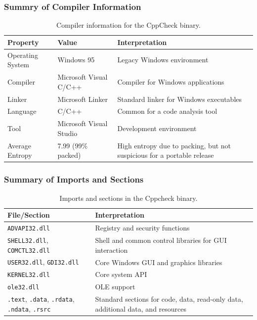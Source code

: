 \documentclass{article}
\begin{document}
\subsubsection{Summry of Compiler Information}
\begin{table}[H]
  \centering
  \begin{tabular}{|p{3cm}|p{3cm}|p{6cm}|}
    \hline
    \textbf{Property} & \textbf{Value} & \textbf{Interpretation} \\
    \hline
    Operating System & Windows 95 & Legacy Windows environment \\
    \hline
    Compiler & Microsoft Visual C/C++ & Compiler for Windows applications \\
    \hline
    Linker & Microsoft Linker & Standard linker for Windows executables \\
    \hline
    Language & C/C++ &  Common for a code analysis tool \\
    \hline
    Tool & Microsoft Visual Studio & Development environment \\
    \hline
    Average Entropy & 7.99 (99\% packed) & High entropy due to packing, but not suspicious for a portable release \\
    \hline
  \end{tabular}
  \caption{Compiler information for the CppCheck binary.}
  \label{tab:cppcheck-compiler}
\end{table}
\subsubsection{Summary of Imports and Sections}
\begin{table}[H]
  \centering
  \begin{tabular}{|p{4cm}|p{8cm}|}
    \hline
    \textbf{File/Section} & \textbf{Interpretation} \\
    \hline
    \texttt{ADVAPI32.dll} & Registry and security functions \\
    \hline
    \texttt{SHELL32.dll}, \texttt{COMCTL32.dll} & Shell and common control libraries for GUI interaction \\
    \hline
    \texttt{USER32.dll}, \texttt{GDI32.dll} & Core Windows GUI and graphics libraries \\
    \hline
    \texttt{KERNEL32.dll} & Core system API \\
    \hline
    \texttt{ole32.dll} & OLE support \\
    \hline
    \texttt{.text}, \texttt{.data}, \texttt{.rdata}, \texttt{.ndata}, \texttt{.rsrc} & Standard sections for code, data, read-only data, additional data, and resources \\
    \hline
  \end{tabular}
  \caption{Imports and sections in the Cppcheck binary.}
  \label{tab:cppcheck-imports}
\end{table}
\end{document}
